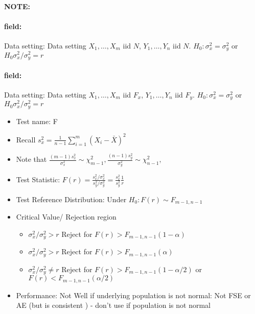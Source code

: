\documentclass[12pt]{article}
\newenvironment{note}{\paragraph{NOTE:}}{}
\newenvironment{field}{\paragraph{field:}}{}
\begin{document}
\begin{note}
 \begin{field}
  Data setting: Data setting $X_1, \ldots , X_m$ iid $N$, $Y_1, \ldots, Y_n$ iid $N$. $H_0: \sigma_x^2 = \sigma_y^2$ or $H_0 \sigma_x^2/\sigma_y^2 = r$
 \end{field}
 \begin{field}
  Data setting: Data setting $X_1, \ldots , X_m$ iid $F_x$, $Y_1, \ldots, Y_n$ iid $F_y$. $H_0: \sigma_x^2 = \sigma_y^2$ or $H_0 \sigma_x^2/\sigma_y^2 = r$
  \begin{itemize}
   \item Test name: F
   \item Recall $s_x^2 = \frac{1}{n-1}\sum_{i=1}^m(X_i - \bar{X})^2$
   \item Note that $\frac{(m-1)s_x^2}{\sigma_x^2} \sim \chi^2_{m-1}, \frac{(n-1)s_y^2}{\sigma_y^2} \sim \chi^2_{n-1},$
   \item Test Statistic: $F(r) = \frac{s_x^2/\sigma_x^2}{s_y^2/\sigma_y^2} = \frac{s_x^2}{s_y^2} \frac{1}{r}$
   \item Test Reference Distribution: Under $H_0: F(r) \sim F_{m-1,n-1}$
   \item Critical Value/ Rejection region
         \begin{itemize}
          \item $\sigma_x^2/\sigma_y^2 > r$ Reject for $F(r) > F_{m-1,n-1}(1-\alpha)$
          \item $\sigma_x^2/\sigma_y^2 > r$ Reject for $F(r) > F_{m-1,n-1}(\alpha)$
          \item $\sigma_x^2/\sigma_y^2 \neq r$ Reject for $F(r) > F_{m-1,n-1}(1-\alpha/2)$ or $F(r) < F_{m-1,n-1}(\alpha/2)$
         \end{itemize}
   \item Performance: Not Well if underlying population is not normal: Not FSE or AE (but is consistent ) - don't use if population is not normal
  \end{itemize}
 \end{field}
\end{note}
\end{document}
